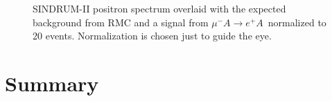 \documentclass[12pt]{article}
\newcommand {\mumepconv} {\mbox{$\mu^- A \rightarrow e^+ A$}}
\begin{document}
\begin{figure}
\caption {
  \label{fig:ana_step2_sindrum_positron_best_fit_signal}
  SINDRUM-II positron spectrum overlaid with the expected background from RMC
  and a signal from \mumepconv\ normalized to 20 events. Normalization is chosen
  just to guide the eye.
}
\end{figure}


\newpage
\section{ Summary }
\end{document}
